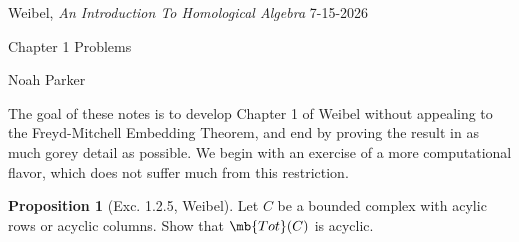 \documentclass[12pt]{amsart}
\newcommand{\Tot}{\mb{Tot}}
\theoremstyle{definition}
\newtheorem{proposition}{Proposition}
\begin{document}
{Weibel, \textit{An Introduction To Homological Algebra}} \hfill {7-15-2026}

\bigskip\bigskip

\begin{center}

{\sc Chapter 1 Problems}

\end{center}

\begin{center}

  {Noah Parker} 
    
\end{center}

\bigskip

The goal of these notes is to develop Chapter 1 of Weibel without appealing to the Freyd-Mitchell Embedding Theorem, and end by proving the result in as much gorey detail as possible.
We begin with an exercise of a more computational flavor, which does not suffer much from this restriction.

\begin{proposition}[Exc. 1.2.5, Weibel]
      Let $C$ be a bounded complex with acylic rows or acyclic columns. 
      Show that $\Tot(C)$ is acyclic.
\end{proposition}
\end{document}

